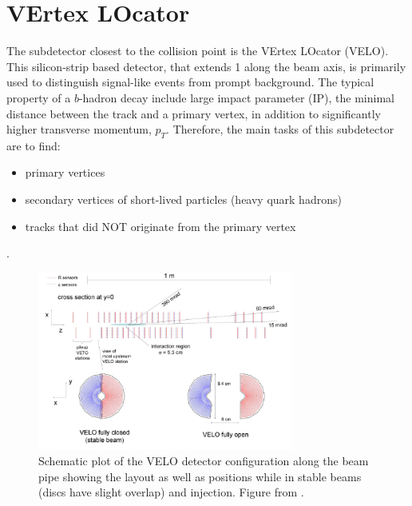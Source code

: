 
\section{VErtex LOcator }
\label{velosys}
The subdetector closest to the collision point is the VErtex LOcator (\Gls{VELO}). This silicon-strip based detector, that extends 1 \m along the beam axis, is primarily used to distinguish signal-like events from prompt background. The typical property of a $b$-hadron decay include large impact parameter (\Gls{IP}), the minimal distance between the track and a primary vertex, in addition to significantly higher transverse momentum, $p_{T}$. Therefore, the main tasks of this subdetector are to find: 
\begin{itemize}
\item primary vertices
\item secondary vertices of short-lived particles (heavy quark hadrons)
\item tracks that did NOT originate from the primary vertex
\end{itemize}.


\begin{figure}[!h]
	\centering
	\includegraphics[width = 0.75\textwidth]{figs/detector/license/Velo_croped.pdf}
	\caption{Schematic plot of the \Gls{VELO} detector configuration along the beam pipe showing the layout as well as positions while in stable beams (discs have slight overlap) and injection. Figure from \cite{det_paper}.}
	\label{fig:veloover}
\end{figure}

